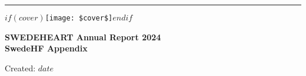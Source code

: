 
\rule{\textwidth}{1pt} %
\vspace{0.1\textheight} %

\centering %

$if(cover)$\texttt{[image: \$cover\$]}$endif$

\vspace{0.15\textheight}

{\huge\bfseries\nohyphens{SWEDEHEART Annual Report 2024}}\\[2\baselineskip] 
{\huge\bfseries\nohyphens{SwedeHF Appendix}}\\[2\baselineskip] 



\vspace{0.25\textheight}

\raggedright{Created: $date$}